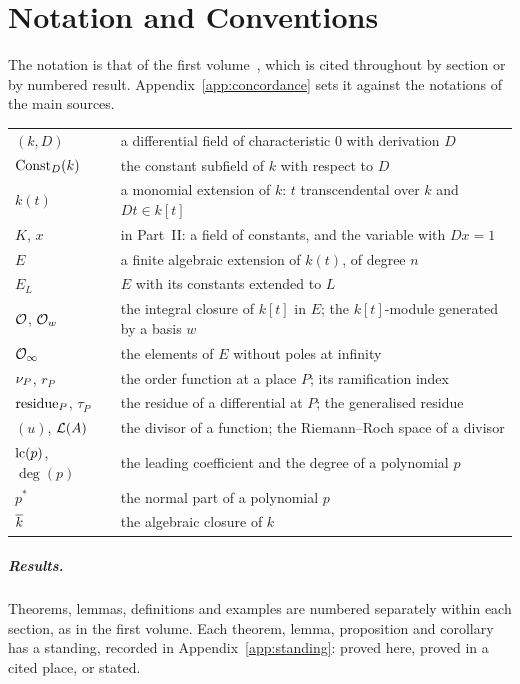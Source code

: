 \chapter{Notation and Conventions}

The notation is that of the first volume~\cite{bronstein2005}, which is cited
throughout by section or by numbered result. Appendix~\ref{app:concordance}
sets it against the notations of the main sources.

\begin{center}
\begin{tabular}{@{}lp{.68\linewidth}@{}}
\toprule
$(k, D)$ & a differential field of characteristic $0$ with derivation $D$\\
$\operatorname{Const}_D(k)$ & the constant subfield of $k$ with respect to $D$\\
$k(t)$ & a monomial extension of $k$: $t$ transcendental over $k$ and $Dt \in k[t]$\\
$K$, $x$ & in Part~II: a field of constants, and the variable with $Dx = 1$\\
$E$ & a finite algebraic extension of $k(t)$, of degree $n$\\
$E_L$ & $E$ with its constants extended to $L$\\
$\mathcal{O}$, $\mathcal{O}_w$ & the integral closure of $k[t]$ in $E$; the $k[t]$-module generated by a basis $w$\\
$\mathcal{O}_\infty$ & the elements of $E$ without poles at infinity\\
$\nu_{P}$, $r_P$ & the order function at a place $P$; its ramification index\\
$\operatorname{residue}_P$, $\tau_P$ & the residue of a differential at $P$; the generalised residue\\
$(u)$, $\mathcal{L}(A)$ & the divisor of a function; the Riemann--Roch space of a divisor\\
$\operatorname{lc}(p)$, $\deg(p)$ & the leading coefficient and the degree of a polynomial $p$\\
$p^*$ & the normal part of a polynomial $p$\\
$\overline{k}$ & the algebraic closure of $k$\\
\bottomrule
\end{tabular}
\end{center}

\paragraph{Results.} Theorems, lemmas, definitions and examples are numbered
separately within each section, as in the first volume. Each theorem, lemma,
proposition and corollary has a standing, recorded in
Appendix~\ref{app:standing}: proved here, proved in a cited place, or stated.

